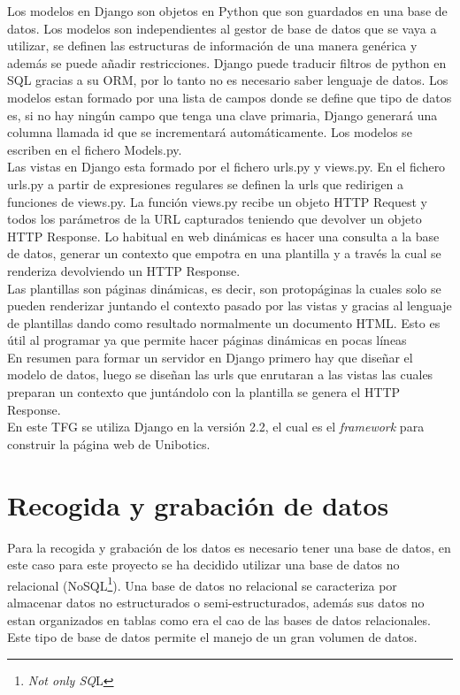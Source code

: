 Los modelos en Django son objetos en Python que son guardados en una base de datos. Los modelos son independientes al gestor de base de datos que se vaya a utilizar, se definen las estructuras de información de una manera genérica y además se puede añadir restricciones. Django puede traducir filtros de python en SQL gracias a su ORM, por lo tanto no es necesario saber lenguaje de datos. Los modelos estan formado por una lista de campos donde se define que tipo de datos es, si no hay ningún campo que tenga una clave primaria, Django generará una columna llamada id que se incrementará automáticamente. Los modelos se escriben en el fichero Models.py.\cite{model}\\

Las vistas en Django esta formado por el fichero urls.py y views.py. En el fichero urls.py a partir de expresiones regulares se definen la urls que redirigen a funciones de views.py. La función views.py recibe un objeto HTTP Request y todos los parámetros de la URL capturados teniendo que devolver un objeto HTTP Response. Lo habitual en web dinámicas es hacer una consulta a la base de datos, generar un contexto que empotra en una plantilla y a través la cual se renderiza devolviendo un HTTP Response.\\

Las plantillas son páginas dinámicas, es decir, son protopáginas la cuales solo se pueden renderizar juntando el contexto pasado por las vistas y gracias al lenguaje de plantillas dando como resultado normalmente un documento HTML. Esto es útil al programar ya que permite hacer páginas dinámicas en pocas líneas\\
\newpage
En resumen para formar un servidor en Django primero hay que diseñar el modelo de datos, luego se diseñan las urls que enrutaran a las vistas las cuales preparan un contexto que juntándolo con la plantilla se genera el HTTP Response.\\

En este TFG se utiliza Django en la versión 2.2, el cual es el\textit{ framework} para construir la página web de Unibotics.

\section{Recogida y grabación de datos}
Para la recogida y grabación de los datos es necesario tener una base de datos, en este caso para este proyecto se ha decidido utilizar una base de datos no relacional (NoSQL\footnote{\textit{Not only SQ}L}). Una base de datos no relacional se caracteriza por almacenar datos no estructurados o semi-estructurados, además sus datos no estan organizados en tablas como era el cao de las bases de datos relacionales. Este tipo de base de datos permite el manejo de un gran volumen de datos.\\

